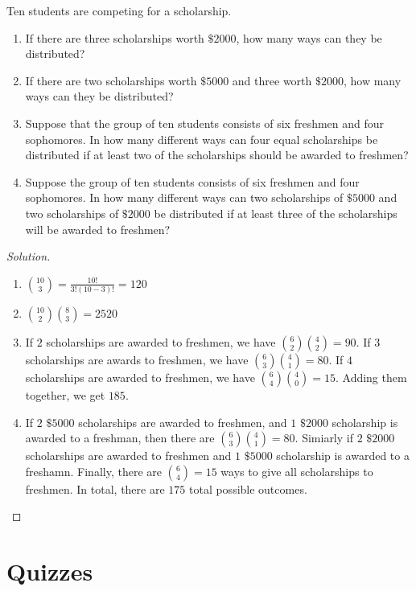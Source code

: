     \begin{problem}
    Ten students are competing for a scholarship.
    \begin{enumerate}
        \item If there are three scholarships worth $\$2000$, how many ways can they be distributed?
        \item If there are two scholarships worth $\$5000$ and three worth $\$2000$, how many ways can they be distributed?
        \item Suppose that the group of ten students consists of six freshmen and four sophomores. In how many different ways can four equal scholarships be distributed if at least two of the scholarships should be awarded to freshmen?
        \item Suppose the group of ten students consists of six freshmen and four sophomores. In how many different ways can two scholarships of $\$5000$ and two scholarships of $\$2000$ be distributed if at least three of the scholarships will be awarded to freshmen?
    \end{enumerate}
    \end{problem}
    \begin{proof}[Solution]
    \vspace{-\topsep}
    \
    \begin{enumerate}
        \item $\binom{10}{3} = \frac{10!}{3!(10-3)!} = 120$
        \item $\binom{10}{2}\binom{8}{3} = 2520$
        \item If $2$ scholarships are awarded to freshmen, we have $\binom{6}{2}\binom{4}{2} = 90$. If $3$ scholarships are awards to freshmen, we have $\binom{6}{3}\binom{4}{1} = 80$. If $4$ scholarships are awarded to freshmen, we have $\binom{6}{4}\binom{4}{0} = 15$. Adding them together, we get $185$.
        \item If $2$ $\$5000$ scholarships are awarded to freshmen, and $1$ $\$2000$ scholarship is awarded to a freshman, then there are $\binom{6}{3}\binom{4}{1}=80$. Simiarly if $2$ $\$2000$ scholarships are awarded to freshmen and $1$ $\$5000$ scholarship is awarded to a freshamn. Finally, there are $\binom{6}{4}=15$ ways to give all scholarships to freshmen. In total, there are $175$ total possible outcomes.
    \end{enumerate}
    \end{proof}
    \section{Quizzes}
